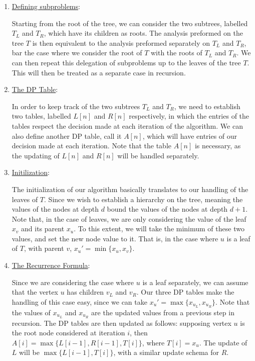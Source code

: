 \begin{solution}

    \begin{enumerate}
        \item \underline{Defining subproblems}:
        
        \hop
        Starting from the root of the tree, we can consider the two subtrees, labelled $T_L$ and $T_R$, which have its children as roots. The analysis preformed on the tree $T$ is then equivalent to the analysis preformed separately on $T_L$ and $T_R$, bar the case where we consider the root of $T$ with the roots of $T_L$ and $T_R$. We can then repeat this delegation of subproblems up to the leaves of the tree $T$. This will then be treated as a separate case in recursion. 

        \item \underline{The DP Table}:

        \hop
        In order to keep track of the two subtrees $T_L$ and $T_R$, we need to establish two tables, labelled $L[n]$ and $R[n]$ respectively, in which the entries of the tables respect the decision made at each iteration of the algorithm. We can also define another DP table, call it $A[n]$, which will have entries of our decision made at each iteration. Note that the table $A[n]$ is necessary, as the updating of $L[n]$ and $R[n]$ will be handled separately.

        \newpage
        \item \underline{Initilization}:

        \hop
        The initialization of our algorithm basically translates to our handling of the leaves of $T$. Since we wish to establish a hierarchy on the tree, meaning the values of the nodes at depth $d$ bound the values of the nodes at depth $d+1$. Note that, in the case of leaves, we are only considering the value of the leaf $x_v$ and its parent $x_u$. To this extent, we will take the minimum of these two values, and set the new node value to it. That is, in the case where $u$ is a leaf of $T$, with parent $v$, $x_u'= \min\{x_u, x_v\}$. 

        \item \underline{The Recurrence Formula}: 

        \hop
        Since we are considering the case where $u$ is a leaf separately, we can assume that the vertex $u$ has children $v_L$ and $v_R$. Our three DP tables make the handling of this case easy, since we can take $x_u' = \max\{x_{u_L}, x_{u_R}\}$. Note that the values of $x_{u_L}$ and $x_{u_{R}}$ are the updated values from a previous step in recursion. The DP tables are then updated as follows: supposing vertex $u$ is the root node considered at iteration $i$, then $A[i] = \max\{L[i-1], R[i-1], T[i]\}$, where $T[i] = x_u$. The update of $L$ will be $\max\{L[i-1], T[i]\}$, with a similar update schema for $R$. 


\end{enumerate}
\end{solution}
